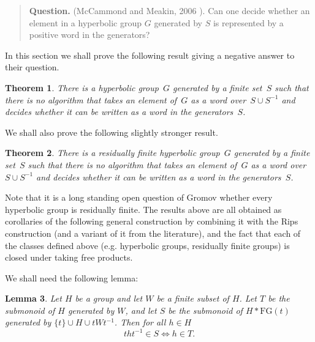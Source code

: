 \documentclass[11pt]{amsart}
\theoremstyle{plain}
\newtheorem{theorem}{Theorem}[section]
\newtheorem{lemma}[theorem]{Lemma}
\theoremstyle{definition}
\begin{document}
\begin{quote} {\bf Question.} (McCammond and Meakin, 2006 \cite[Problem~1]{McCammondMeakin}). Can one decide whether an element in a hyperbolic group $G$ generated by $S$ is represented by a positive word in the generators? 
\end{quote}
In this section we shall prove the following result giving a negative answer to their question.  





\begin{theorem}\label{thm:posUndecHyp}
There is a hyperbolic group~$G$ generated by a finite set~$S$ such that there is no algorithm that takes an element of~$G$ as a word over~$S \cup S^{-1}$ and decides whether it can be written as a word in the generators~$S$.       
\end{theorem}
We shall also prove the following slightly stronger result.  
\begin{theorem}\label{thm:ResFin} 
There is a residually finite hyperbolic group~$G$ generated by a finite set~$S$ such that there is no algorithm that takes an element of~$G$ as a word over~$S \cup S^{-1}$ and decides whether it can be written as a word in the generators~$S$.       
\end{theorem}
Note that it is a long standing open question of Gromov whether every hyperbolic group is residually finite.
The results above are all obtained as corollaries of the following general construction by combining it with the Rips construction (and a variant of it from the literature), and the fact that each of the classes defined above (e.g. hyperbolic groups, residually finite groups) is closed under taking free products. 

We shall need the following lemma:
\begin{lemma}\cite[Lemma~3.6]{gray2020undecidability}\label{lem:L36} 
Let $H$ be a group and let $W$ be a finite subset of $H$. Let $T$ be the submonoid of $H$ generated by $W$, and let $S$ be the submonoid of $H \ast \mathrm{FG}(t)$ generated by $\{t\} \cup H \cup tWt^{-1}$. Then for all $h \in H$ 
\[ tht^{-1 } \in  S \Leftrightarrow  h \in T.  \]
  \end{lemma} 
\end{document}
